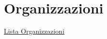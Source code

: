 \section{Organizzazioni}\label{organizzazioni}

\href{Lista\%20Organizzazioni\%206c3125f8072d475d92164bddc5d41d7d.csv}{Lista
Organizzazioni}
